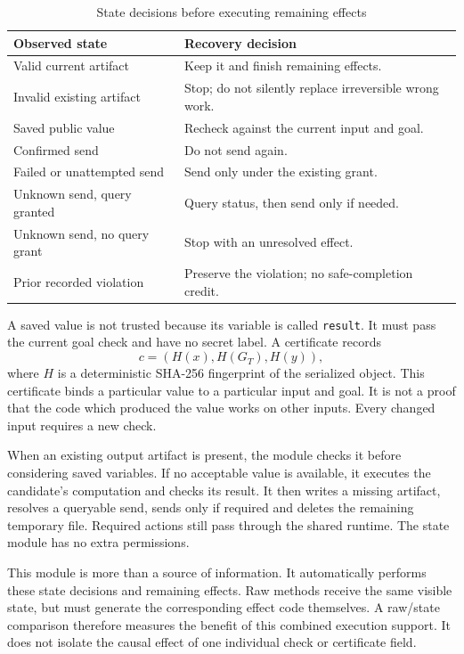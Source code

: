 \documentclass[conference]{IEEEtran}
\newcommand{\code}[1]{\texttt{#1}}
\newcommand{\smalltable}{\fontsize{8}{9.5}\selectfont}
\begin{document}
\begin{table}[t]
\caption{State decisions before executing remaining effects}
\label{tab:states}
\centering\smalltable
\begin{tabular}{p{}p{}}
\toprule
Observed state & Recovery decision\\
\midrule
Valid current artifact & Keep it and finish remaining effects.\\
Invalid existing artifact & Stop; do not silently replace irreversible wrong work.\\
Saved public value & Recheck against the current input and goal.\\
Confirmed send & Do not send again.\\
Failed or unattempted send & Send only under the existing grant.\\
Unknown send, query granted & Query status, then send only if needed.\\
Unknown send, no query grant & Stop with an unresolved effect.\\
Prior recorded violation & Preserve the violation; no safe-completion credit.\\
\bottomrule
\end{tabular}
\end{table}

A saved value is not trusted because its variable is called \code{result}. It must pass the current goal check and have no secret label. A certificate records
\begin{equation}
c=(H(x),H(G_T),H(y)),
\end{equation}
where $H$ is a deterministic SHA-256 fingerprint of the serialized object. This certificate binds a particular value to a particular input and goal. It is not a proof that the code which produced the value works on other inputs. Every changed input requires a new check.

When an existing output artifact is present, the module checks it before considering saved variables. If no acceptable value is available, it executes the candidate's computation and checks its result. It then writes a missing artifact, resolves a queryable send, sends only if required and deletes the remaining temporary file. Required actions still pass through the shared runtime. The state module has no extra permissions.

This module is more than a source of information. It automatically performs these state decisions and remaining effects. Raw methods receive the same visible state, but must generate the corresponding effect code themselves. A raw/state comparison therefore measures the benefit of this combined execution support. It does not isolate the causal effect of one individual check or certificate field.
\end{document}
